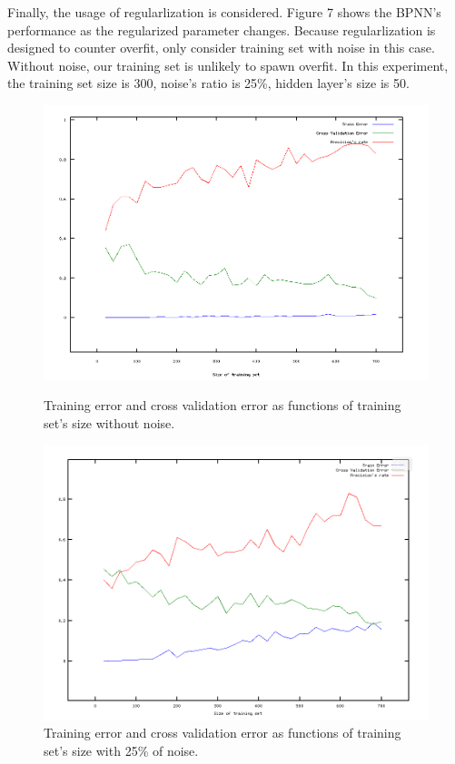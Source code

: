 \documentclass[a4paper, 11pt]{article}
\begin{document}
Finally, the usage of regularlization is considered. Figure 7 shows the BPNN's performance as the regularized parameter changes. Because regularlization is designed to counter overfit, only consider training set with noise in this case. Without noise, our training set is unlikely to spawn overfit. In this experiment, the training set size is 300, noise's ratio is 25\%, hidden layer's size is 50. 

\begin{figure}[t]
  \centering
  \includegraphics[scale=0.45]{1}
  \caption{Training error and cross validation error as functions of training set's size without noise.}
  \label{fig:m1}
  \includegraphics[scale=0.45]{2}
  \caption{Training error and cross validation error as functions of training set's size with 25\% of noise.}
  \label{fig:m2}
\end{figure}
\end{document}
